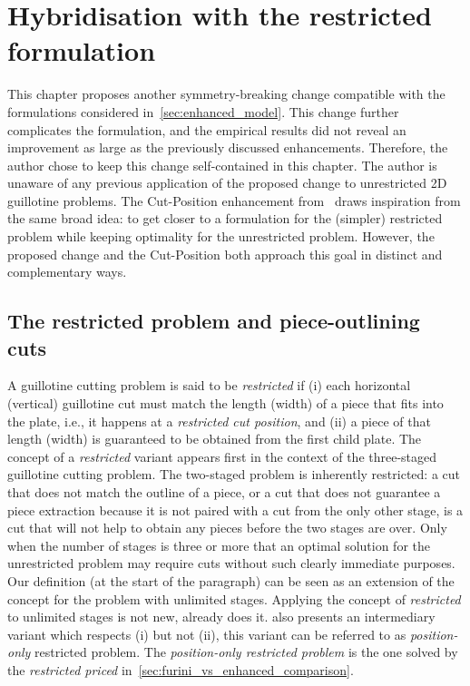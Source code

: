 \documentclass[ppgc,tese,english,formais,babel]{iiufrgs}
\begin{document}




\chapter{Hybridisation with the restricted formulation}

This chapter proposes another symmetry-breaking change compatible with the formulations considered in~\cref{sec:enhanced_model}.
This change further complicates the formulation, and the empirical results did not reveal an improvement as large as the previously discussed enhancements.
Therefore, the author chose to keep this change self-contained in this chapter.
The author is unaware of any previous application of the proposed change to unrestricted 2D guillotine problems.
The Cut-Position enhancement from~\citet{furini:2016} draws inspiration from the same broad idea: to get closer to a formulation for the (simpler) restricted problem while keeping optimality for the unrestricted problem.
However, the proposed change and the Cut-Position both approach this goal in distinct and complementary ways.

\section{The restricted problem and piece-outlining cuts}

A guillotine cutting problem is said to be \emph{restricted} if (i) each horizontal (vertical) guillotine cut must match the length (width) of a piece that fits into the plate, i.e., it happens at a \emph{restricted cut position}, and (ii) a piece of that length (width) is guaranteed to be obtained from the first child plate.
The concept of a \emph{restricted} variant appears first in the context of the three-staged guillotine cutting problem.
The two-staged problem is inherently restricted: a cut that does not match the outline of a piece, or a cut that does not guarantee a piece extraction because it is not paired with a cut from the only other stage, is a cut that will not help to obtain any pieces before the two stages are over.
Only when the number of stages is three or more that an optimal solution for the unrestricted problem may require cuts without such clearly immediate purposes.
Our definition (at the start of the paragraph) can be seen as an extension of the concept for the problem with unlimited stages.
Applying the concept of \emph{restricted} to unlimited stages is not new, \citet{furini:2016} already does it. \citet{furini:2016} also presents an intermediary variant which respects (i) but not (ii), this variant can be referred to as \emph{position-only} restricted problem.
The \emph{position-only restricted problem} is the one solved by the \emph{restricted priced} in~\cref{sec:furini_vs_enhanced_comparison}.
\end{document}

